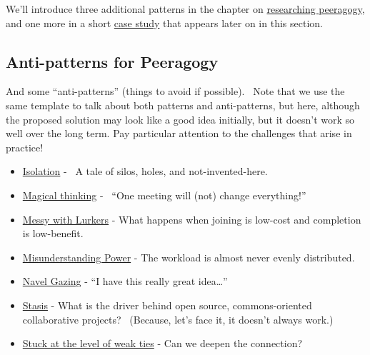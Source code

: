 We'll introduce three additional patterns in the chapter on
\href{http://peeragogy.org/to-peeragogy/researching-peeragogy/}{researching
peeragogy}, and one more in a short
\href{http://peeragogy.org/case-study-learning-to-use-technology-with-peers-the-case-of-swats/}{case
study} that appears later on in this section.

\subsection{Anti-patterns for Peeragogy}

And some ``anti-patterns'' (things to avoid if possible).~ Note that we
use the same template to talk about both patterns and anti-patterns, but
here, although the proposed solution may look like a good idea
initially, but it doesn't work so well over the long term. Pay
particular attention to the challenges that arise in practice!

\begin{itemize}
\itemsep1pt\parskip0pt
\item
  \href{http://peeragogy.org/antipatterns/isolation/}{Isolation} -~ A
  tale of silos, holes, and not-invented-here.
\item
  \href{http://peeragogy.org/antipatterns/magical-thinking/}{Magical
  thinking} - ~``One meeting will (not) change everything!''
\item
  \href{http://peeragogy.org/antipatterns/co-learning-messy-with-lurkers/}{Messy
  with Lurkers} - What happens when joining is low-cost and completion
  is low-benefit.
\item
  \href{http://peeragogy.org/antipatterns/misunderstanding-power/}{Misunderstanding
  Power} - The workload is almost never evenly distributed.
\item
  \href{http://peeragogy.org/antipatterns/navel-gazing/}{Navel Gazing} -
  ``I have this really great idea\ldots{}''
\item
  \href{http://peeragogy.org/antipatterns/stasis/}{Stasis} - What is the
  driver behind open source, commons-oriented collaborative projects?~
  (Because, let's face it, it doesn't always work.)
\item
  \href{http://peeragogy.org/antipatterns/stuck-at-the-level-of-weak-ties/}{Stuck
  at the level of weak ties} - Can we deepen the connection?
\end{itemize}


